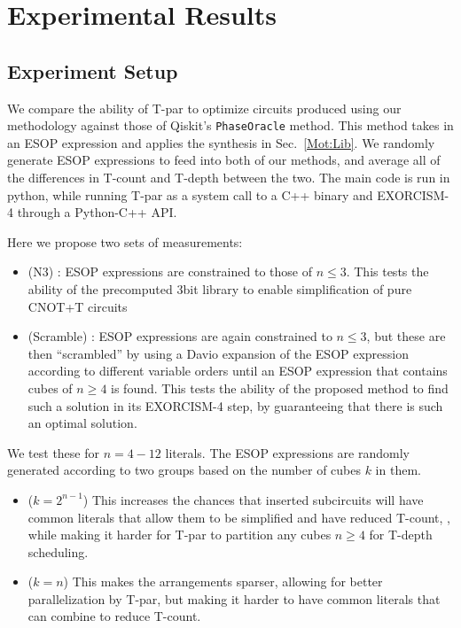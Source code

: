 \section{Experimental Results}
\label{Exp}
\subsection{Experiment Setup}
\label{Exp:Set}
We compare the ability of T-par to optimize circuits produced using our methodology against those of
Qiskit's \texttt{PhaseOracle} method. This method takes in an ESOP expression and applies the synthesis in
Sec.~\ref{Mot:Lib}. We randomly generate ESOP expressions to feed into both of our methods, and average all
of the differences in T-count and T-depth between the two. The main code is run in python, while running
T-par as a system call to a C++ binary and EXORCISM-4 through a Python-C++ API.

Here we propose two sets of measurements:

\begin{itemize}
\item (N3) : ESOP expressions are constrained to those of $n \leq 3$. This tests the ability of the
  precomputed 3bit library to enable simplification of pure CNOT+T circuits
\item (Scramble) : ESOP expressions are again constrained to $n \leq 3$, but these are then ``scrambled''
  by using a Davio expansion of the ESOP expression according to different variable orders until an ESOP expression
  that contains cubes of $n \geq 4$ is found. This tests the ability of the proposed method to find such a
  solution in its EXORCISM-4 step, by guaranteeing that there is such an optimal solution.
\end{itemize}

We test these for $n=4-12$ literals. The ESOP expressions are randomly generated according to two groups
based on the number of cubes $k$ in them.

\begin{itemize}
\item ($k=2^{n-1}$) This increases the chances that inserted subcircuits will have common literals that allow them
  to be simplified and have reduced T-count, , while making it harder for T-par to partition any cubes $n \geq 4$
  for T-depth scheduling.
\item ($k=n$) This makes the arrangements sparser, allowing for better parallelization by T-par, but making
  it harder to have common literals that can combine to reduce T-count.
\end{itemize}

